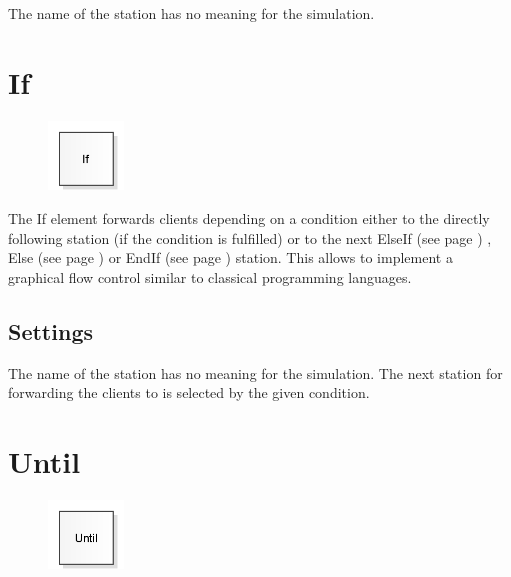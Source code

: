 The name of the station has no meaning for the simulation.


\section{If}
\label{ref:ModelElementLogicIf}

\begin{figure}
\vspace{-22pt}
\includegraphics[width=2cm]{imageModelElementLogicIf.png}
\vspace{-22pt}
\end{figure}

The If element forwards clients depending on a condition either to the directly following station
(if the condition is fulfilled) or to the next ElseIf (see page \pageref{ref:ModelElementLogicElseIf}) ,
Else (see page \pageref{ref:ModelElementLogicElse}) or EndIf (see page \pageref{ref:ModelElementLogicEndIf}) 
station. This allows to implement a graphical flow control similar to classical programming
languages.

\subsection*{Settings}

The name of the station has no meaning for the simulation.
The next station for forwarding the clients to is selected by the given condition.


\section{Until}
\label{ref:ModelElementLogicUntil}

\begin{figure}
\vspace{-22pt}
\includegraphics[width=2cm]{imageModelElementLogicUntil.png}
\vspace{-22pt}
\end{figure}

